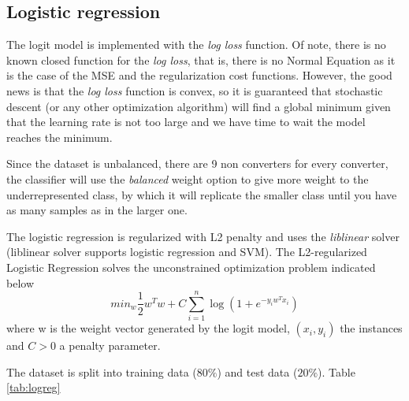 \documentclass[11pt]{article}
\theoremstyle{definition}
\theoremstyle{remark}
\begin{document}


\subsection{Logistic regression}
\label{se:reslogreg}

The logit model is implemented with the \emph{log loss} function. Of note, there is no known closed function for the \emph{log loss}, that is, there is no Normal Equation as it is the case of the MSE and the regularization cost functions. However, the good news is that the \emph{log loss} function is convex, so it is guaranteed that stochastic descent (or any other optimization algorithm)  will find a global minimum given that the learning rate is not too large and we have time to wait the model reaches the minimum.

Since the dataset is unbalanced, there are 9 non converters for every converter, the classifier will use the \emph{balanced} weight option to give more weight to the underrepresented class, by which it will replicate the smaller class until you have as many samples as in the larger one. 

The logistic regression is regularized with L2 penalty and uses the \emph{liblinear} solver (liblinear solver supports logistic regression and SVM). 
The L2-regularized Logistic Regression solves the unconstrained optimization problem indicated below \cite{fan2008liblinear}
\begin{equation}
\textit{min}_{w} \frac{1}{2}w^Tw + C \sum_{i=1}^{n}\log(1+ e^{-y_iw^Tx_i})
\end{equation}
where w is the weight vector generated by the logit model, $(x_i,y_i)$ the instances and $C > 0$ a penalty parameter.

The dataset is split into training data ($80\%$) and test data ($20\%$). Table \ref{tab:logreg}
\end{document}
